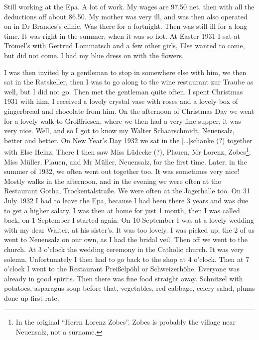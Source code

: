 \documentclass[a5paper,11pt,openany]{book}
\newcommand{\seite}[1]{\leavevmode\marginpar{\footnotesize\itshape\raggedright #1}\ignorespaces}
\newcommand{\jahr}[1]{\par\medskip\noindent{\scshape #1}\par\nopagebreak}
\begin{document}
\jahr{The year 1931.}
\seite{13}
Still working at the Epa.
A lot of work.
My wages are 97.50 net, then with all the deductions off about 86.50.
My mother was very ill, and was then also operated on in Dr Brandes's clinic.
Was there for a fortnight.
Then was still ill for a long time.
It was right in the summer, when it was so hot.
At Easter 1931 I sat at Trömel's with Gertrud Lommatsch and a few other girls, Else wanted to come, but did not come.
I had my blue dress on with the flowers.

\seite{14}
I was then invited by a gentleman to stop in somewhere else with him, we then sat in the Ratskeller,
  then I was to go along to the wine restaurant zur Traube as well, but I did not go.
Then met the gentleman quite often.
I spent Christmas 1931 with him,
  I received a lovely crystal vase with roses and a lovely box of gingerbread and chocolate from him.
On the afternoon of Christmas Day we went for a lovely walk to Großfriesen, where we then
\seite{15}
had a very fine supper, it was very nice.
Well, and so I got to know my Walter Schaarschmidt, Neuensalz, better and better.
On New Year's Day 1932 we sat in the [\ldots]schänke (?) together with Else Heinz.
There I then saw Miss Lüdecke (?), Plauen, Mr Lorenz, Zobes\footnote{In the original ``Herrn Lorenz Zobes''. Zobes is probably the village near Neuensalz, not a surname.},
  Miss Müller, Plauen, and Mr Müller, Neuensalz, for the first time.
Later, in the summer of 1932, we often went out together too.
It was sometimes very nice!
Mostly walks in the afternoon, and in the evening we were often
\seite{16}
at the Restaurant Gotha, Trockentalstraße.
We were often at the Jägerhalle too.
On 31 July 1932 I had to leave the Epa, because I had been there 3 years and was due to get a higher salary.
I was then at home for just 1 month, then I was called back, on 1 September I started again.
On 10 September I was at a lovely wedding with my dear Walter, at his sister's.
It was too lovely.
I was picked up, the 2 of us went to Neuensalz on our own, as
\seite{17}
I had the bridal veil.
Then off we went to the church.
At 3 o'clock the wedding ceremony in the Catholic church.
It was very solemn.
Unfortunately I then had to go back to the shop at 4 o'clock.
Then at 7 o'clock I went to the Restaurant Preißelpöhl or Schweizerhöhe.
Everyone was already in good spirits.
Then there was fine food straight away.
Schnitzel with potatoes, asparagus soup before that, vegetables, red cabbage, celery salad, plums done up first-rate.
\end{document}
